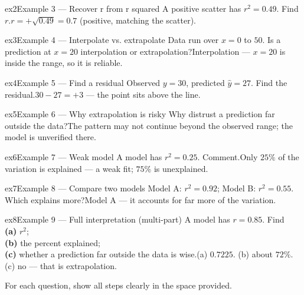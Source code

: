 \documentclass[11pt]{article}
\begin{document}
\begin{example}{ex2}{Example 3 --- Recover r from r squared}
A positive scatter has $r^{2}=0.49$. Find $r$.\soln $r=+\sqrt{0.49}=0.7$ (positive, matching the scatter).
\end{example}

\begin{example}{ex3}{Example 4 --- Interpolate vs. extrapolate}
Data run over $x=0$ to $50$. Is a prediction at $x=20$ interpolation or extrapolation?\soln Interpolation --- $x=20$ is inside the range, so it is reliable.
\end{example}

\begin{example}{ex4}{Example 5 --- Find a residual}
Observed $y=30$, predicted $\hat y=27$. Find the residual.\soln $30-27=+3$ --- the point sits above the line.
\end{example}

\begin{example}{ex5}{Example 6 --- Why extrapolation is risky}
Why distrust a prediction far outside the data?\soln The pattern may not continue beyond the observed range; the model is unverified there.
\end{example}

\begin{example}{ex6}{Example 7 --- Weak model}
A model has $r^{2}=0.25$. Comment.\soln Only $25\%$ of the variation is explained --- a weak fit; $75\%$ is unexplained.
\end{example}

\begin{example}{ex7}{Example 8 --- Compare two models}
Model A: $r^{2}=0.92$; Model B: $r^{2}=0.55$. Which explains more?\soln Model A --- it accounts for far more of the variation.
\end{example}

\begin{example}{ex8}{Example 9 --- Full interpretation (multi-part)}
A model has $r=0.85$. Find \\ \textbf{(a)} $r^{2}$; \\ \textbf{(b)} the percent explained; \\ \textbf{(c)} whether a prediction far outside the data is wise.\soln (a) $0.7225$. (b) about $72\%$. (c) no --- that is extrapolation.
\end{example}

\clearpage
{}
For each question, show all steps clearly in the space provided.
\end{document}

